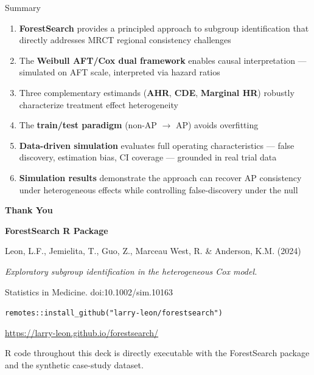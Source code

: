 \documentclass[
  ignorenonframetext,
  aspectratio=169]{beamer}
\begin{document}
\begin{frame}{Summary}
\label{summary}
\begin{enumerate}
\item
  \textbf{ForestSearch} provides a principled approach to subgroup
  identification that directly addresses MRCT regional consistency
  challenges
\item
  The \textbf{Weibull AFT/Cox dual framework} enables causal
  interpretation --- simulated on AFT scale, interpreted via hazard
  ratios
\item
  Three complementary estimands (\textbf{AHR}, \textbf{CDE},
  \textbf{Marginal HR}) robustly characterize treatment effect
  heterogeneity
\item
  The \textbf{train/test paradigm} (non-AP \(\to\) AP) avoids
  overfitting
\item
  \textbf{Data-driven simulation} evaluates full operating
  characteristics --- false discovery, estimation bias, CI coverage ---
  grounded in real trial data
\item
  \textbf{Simulation results} demonstrate the approach can recover AP
  consistency under heterogeneous effects while controlling
  false-discovery under the null
\end{enumerate}
\end{frame}

\begin{frame}[plain]{}
\label{section}
\begin{center}
\vspace{1.5cm}

{\Large \textbf{Thank You}}

\vspace{0.8cm}

\textbf{ForestSearch R Package}

\medskip

Leon, L.F., Jemielita, T., Guo, Z., Marceau West, R. \& Anderson, K.M. (2024)

\emph{Exploratory subgroup identification in the heterogeneous Cox model.}

Statistics in Medicine. doi:10.1002/sim.10163

\vspace{0.8cm}

\texttt{remotes::install\_github("larry-leon/forestsearch")}

\smallskip
\url{https://larry-leon.github.io/forestsearch/}

\vspace{0.5cm}

\small
R code throughout this deck is directly executable with the ForestSearch
package and the synthetic case-study dataset.

\end{center}
\end{frame}
\end{document}
